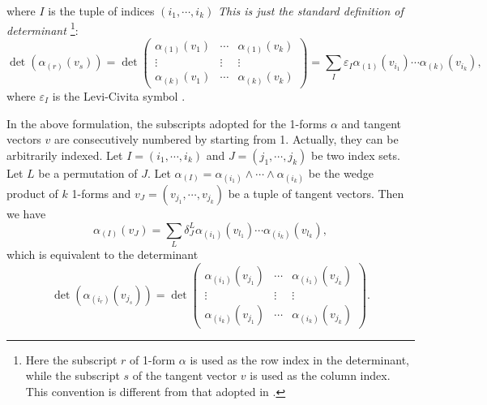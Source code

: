 \documentclass[11pt, a4paper]{book}
\begin{document}
where $I$ is the tuple of indices $(i_1,\cdots,i_k)$ \emph{This is just the standard
  definition of determinant \citep{ZeidlerOxford2004}}\footnote{Here the subscript $r$ of
  1-form $\alpha$ is used as the row index in the determinant, while the subscript $s$ of
  the tangent vector $v$ is used as the column index. This convention is different from
  that adopted in \citep{FrankelGeometry2011}.}:
\begin{equation}
  \label{eq:determinant-definition}
  \det(\alpha_{(r)}(v_{s})) = \det \begin{pmatrix}
    \alpha_{(1)}(v_{1}) & \cdots & \alpha_{(1)}(v_k) \\
    \vdots & \vdots & \vdots \\
    \alpha_{(k)}(v_1) & \cdots & \alpha_{(k)}(v_k)
  \end{pmatrix} = \sum_I \varepsilon_I \alpha_{(1)}(v_{i_1})\cdots\alpha_{(k)}(v_{i_k}),
\end{equation}
where $\varepsilon_I$ is the Levi-Civita symbol \citep{LeviCivita2023}.

In the above formulation, the subscripts adopted for the 1-forms $\alpha$ and tangent
vectors $v$ are consecutively numbered by starting from 1. Actually, they can be
arbitrarily indexed. Let $I = (i_1,\cdots,i_k)$ and $J = (j_1,\cdots,j_k)$ be two index
sets. Let $L$ be a permutation of $J$. Let
$\alpha_{(I)} = \alpha_{(i_1)}\wedge\cdots\wedge\alpha_{(i_k)}$ be the wedge product of
$k$ 1-forms and $v_J = (v_{j_1},\cdots,v_{j_k})$ be a tuple of tangent vectors. Then we
have
\begin{equation}
  \label{eq:1-form-exterior-product-applied-to-k-vector}
  \alpha_{(I)}(v_J) = \sum_{L} \delta_J^{L} \alpha_{(i_1)}(v_{l_1})\cdots\alpha_{(i_k)}(v_{l_k}),
\end{equation}
which is equivalent to the determinant
\begin{equation}
  \label{eq:determinant-definition-with-general-indices}
  \det(\alpha_{(i_r)}(v_{j_s})) = \det \begin{pmatrix}
    \alpha_{(i_1)}(v_{j_1}) & \cdots & \alpha_{(i_1)}(v_{j_k}) \\
    \vdots & \vdots & \vdots \\
    \alpha_{(i_k)}(v_{j_1}) & \cdots & \alpha_{(i_k)}(v_{j_k})
  \end{pmatrix}.
\end{equation}
\end{document}
